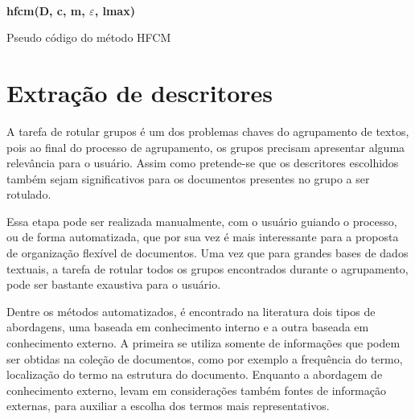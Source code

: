 \leavevmode\\
\begin{algorithm}[!htp]
  \SetAlgoLined 
  \textbf{{\color{blue}hfcm}(D, c, m, $\varepsilon$, lmax)}\\
  \caption{Pseudo código do método HFCM}
  \label{alg:hfcm} 
\end{algorithm}

\section{Extração de descritores} 

A tarefa de rotular grupos é um dos problemas chaves do agrupamento de textos, pois ao final do
processo de agrupamento, os grupos precisam apresentar alguma relevância para o
usuário\cite{Zhang2008}. Assim como pretende-se que os descritores escolhidos também sejam
significativos para os documentos presentes no grupo a ser rotulado. 

Essa etapa pode ser realizada manualmente, com o usuário guiando o processo, ou de forma
automatizada, que por sua vez é mais interessante para a proposta de organização flexível de
documentos. Uma vez que para grandes bases de dados textuais, a tarefa de rotular todos os grupos
encontrados durante o agrupamento, pode ser bastante exaustiva para o usuário.

Dentre os métodos automatizados, é encontrado na literatura dois tipos de abordagens, uma baseada em
conhecimento interno e a outra baseada em conhecimento externo\cite{Nogueira2013}.  A primeira se
utiliza somente de informações que podem ser obtidas na coleção de documentos, como por exemplo a
frequência do termo, localização do termo na estrutura do documento.  Enquanto a abordagem de
conhecimento externo, levam em considerações também fontes de informação externas, para auxiliar a
escolha dos termos mais representativos. 

